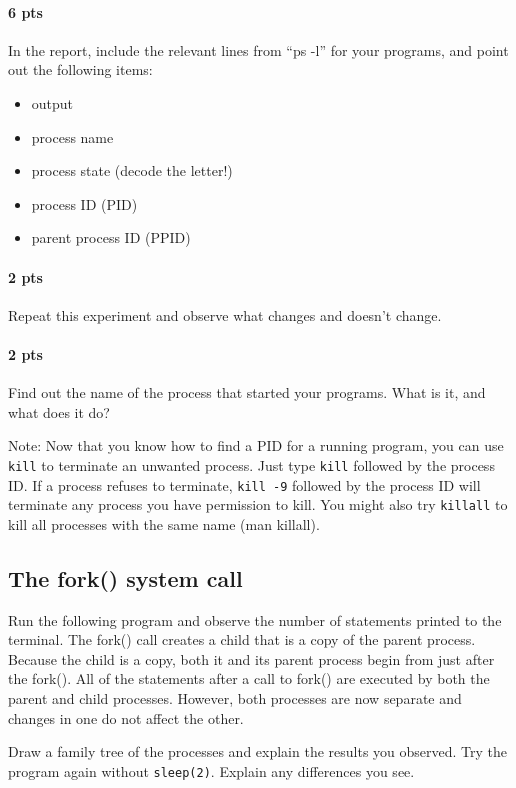 \documentclass[letterpaper,10pt]{article}
\newcommand{\cmd}[1]{\texttt{#1}}
\begin{document}
\paragraph{6 pts} In the report, include the relevant lines from ``ps -l'' for your programs, and point out the following items:
 \begin{itemize}
  \item output
  \item process name
  \item process state (decode the letter!)
  \item process ID (PID)
  \item parent process ID (PPID)
 \end{itemize}

\paragraph{2 pts} Repeat this experiment and observe what changes and doesn't change.
\paragraph{2 pts} Find out the name of the process that started your programs. What is it, and what does it do?

Note: Now that you know how to find a PID for a running program, you can use \cmd{kill} to terminate
an unwanted process. Just type \cmd{kill} followed by the process ID. If a process refuses to
terminate, \cmd{kill -9} followed by the process ID will terminate any process you have permission to kill.
You might also try \cmd{killall} to kill all processes with the same name (man killall).

\subsection{The fork() system call}
Run the following program and observe the number of statements printed to the terminal.
The fork() call creates a child that is a copy of the parent process. Because the child is a copy,
both it and its parent process begin from just after the fork(). All of the statements after a call to
fork() are executed by both the parent and child processes. However, both processes are now
separate and changes in one do not affect the other.

Draw a family tree of the processes and explain the results you observed. Try the program
again without \cmd{sleep(2)}. Explain any differences you see.
\end{document}
